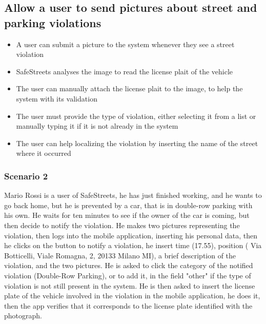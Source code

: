 \subsection{Allow a user to send pictures about street and parking violations}
\begin{itemize}
    \item A user can submit a picture to the system whenever they see a street violation
    \item SafeStreets analyses the image to read the license plait of the vehicle
    \item The user can manually attach the license plait to the image, to help the system with its validation
    \item The user must provide the type of violation, either selecting it from a list or manually typing it if it is not already in the system
    \item The user can help localizing the violation by inserting the name of the street where it occurred
\end{itemize}
\subsubsection{Scenario 2}
Mario Rossi is a user of SafeStreets, he has just finished working, and he wants to go back home, but he is prevented by a car, that is in double-row parking with his own. He waits for ten 
minutes to see if the owner of the car is coming, but then decide to notify the violation. He makes two pictures representing the violation, then logs into the mobile application, 
inserting his personal data, then he clicks on the button to notify a violation, he insert time (17.55), position ( Via Botticelli, Viale Romagna, 2, 20133 Milano MI), a brief description 
of the violation, and the two pictures. He is asked to click the category of the notified violation (Double-Row Parking), or to add it, in the field "other" if the type of violation is not still 
present in the system. He is then asked to insert the license plate of the vehicle involved in the violation in the mobile application, he does it, then the app verifies that it 
corresponds to the license plate identified with the photograph.

